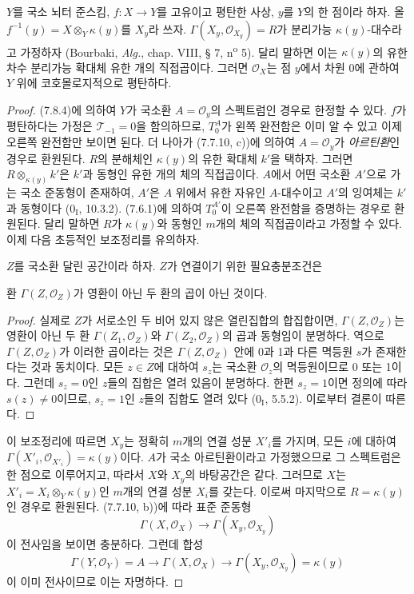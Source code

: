 \begin{proposition}[7.8.6]
$Y$를 국소 뇌터 준스킴, $f:X\to Y$를 고유이고 평탄한 사상, $y$를
$Y$의 한 점이라 하자. 올 $f^{-1}(y)=X\otimes_Y\kappa(y)$를 $X_y$라
쓰자. $\Gamma(X_y,\mathscr O_{X_y})=R$가 분리가능 $\kappa(y)$-대수라고
가정하자 (Bourbaki, \emph{Alg.}, chap. VIII, § 7,
n\textsuperscript{o} 5). 달리 말하면 이는 $\kappa(y)$의 유한 차수
분리가능 확대체 유한 개의 직접곱이다. 그러면 $\mathscr O_X$는 점
$y$에서 차원 0에 관하여 $Y$ 위에 코호몰로지적으로 평탄하다.
\end{proposition}

\begin{proof}
(7.8.4)에 의하여 $Y$가 국소환 $A=\mathscr O_y$의 스펙트럼인 경우로
한정할 수 있다. $f$가 평탄하다는 가정은 $\mathscr T_{-1}=0$을
함의하므로, $T_0^A$가 왼쪽 완전함은 이미 알 수 있고 이제 오른쪽
완전함만 보이면 된다. 더 나아가 (7.7.10, c))에 의하여
$A=\mathscr O_y$가 \emph{아르틴환}인 경우로 환원된다.
$R$의 분해체인 $\kappa(y)$의 유한 확대체 $k'$을 택하자. 그러면
$R\otimes_{\kappa(y)}k'$은 $k'$과 동형인 유한 개의 체의 직접곱이다.
$A$에서 어떤 국소환 $A'$으로 가는 국소 준동형이 존재하여, $A'$은
$A$ 위에서 유한 자유인 $A$-대수이고 $A'$의 잉여체는 $k'$과 동형이다
($0_{\mathrm I}$, 10.3.2). (7.6.1)에 의하여 $T_0^{A'}$이 오른쪽
완전함을 증명하는 경우로 환원된다. 달리 말하면 $R$가 $\kappa(y)$와
동형인 $m$개의 체의 직접곱이라고 가정할 수 있다. 이제 다음 초등적인
보조정리를 유의하자.

\begin{lemma}[7.8.6.1]
$Z$를 국소환 달린 공간이라 하자. $Z$가 연결이기 위한 필요충분조건은

환 $\Gamma(Z,\mathscr O_Z)$가 영환이 아닌 두 환의 곱이 아닌 것이다.
\end{lemma}

\begin{proof}
실제로 $Z$가 서로소인 두 비어 있지 않은 열린집합의
합집합이면, $\Gamma(Z,\mathscr O_Z)$는 영환이 아닌 두 환
$\Gamma(Z_1,\mathscr O_Z)$와 $\Gamma(Z_2,\mathscr O_Z)$의 곱과
동형임이 분명하다. 역으로 $\Gamma(Z,\mathscr O_Z)$가 이러한 곱이라는
것은 $\Gamma(Z,\mathscr O_Z)$ 안에 0과 1과 다른 멱등원 $s$가
존재한다는 것과 동치이다.
모든 $z\in Z$에 대하여 $s_z$는 국소환 $\mathscr O_z$의 멱등원이므로
0 또는 1이다. 그런데 $s_z=0$인 $z$들의 집합은 열려 있음이
분명하다. 한편 $s_z=1$이면 정의에 따라 $s(z)\ne0$이므로, $s_z=1$인
$z$들의 집합도 열려 있다 ($0_{\mathrm I}$, 5.5.2). 이로부터 결론이
따른다.
\end{proof}

이 보조정리에 따르면 $X_y$는 정확히 $m$개의 연결 성분 $X'_i$를
가지며, 모든 $i$에 대하여
$\Gamma(X'_i,\mathscr O_{X'_i})=\kappa(y)$이다. $A$가 국소
아르틴환이라고 가정했으므로 그 스펙트럼은 한 점으로 이루어지고,
따라서 $X$와 $X_y$의 바탕공간은 같다. 그러므로 $X$는
$X'_i=X_i\otimes_Y\kappa(y)$인 $m$개의 연결 성분 $X_i$를 갖는다.
이로써 마지막으로 $R=\kappa(y)$인 경우로 환원된다. (7.7.10, b))에
따라 표준 준동형
\[
  \Gamma(X,\mathscr O_X)
  \longrightarrow
  \Gamma(X_y,\mathscr O_{X_y})
\]
이 전사임을 보이면 충분하다. 그런데 합성
\[
  \Gamma(Y,\mathscr O_Y)=A
  \longrightarrow
  \Gamma(X,\mathscr O_X)
  \longrightarrow
  \Gamma(X_y,\mathscr O_{X_y})=\kappa(y)
\]
이 이미 전사이므로 이는 자명하다.
\end{proof}

